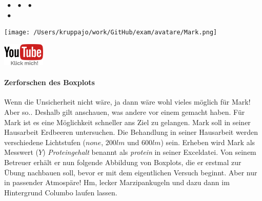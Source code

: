 \documentclass[a4paper, 9pt]{scrartcl}\usepackage[]{graphicx}\usepackage[]{xcolor}
\begin{document}
 
\ifcollection
\begin{flushright}
\tiny\vspace{-3Ex}
\textbf{\examinhaltstart}
\exammodulemathstat $\;\bullet$
\exammodulestat $\;\bullet$
\exammodulestatbbv $\;\bullet$
\exammodulestatversuch\\
\exammodulelanddaten $\;\bullet$
\exammodulebiostat
\vspace{-4Ex}
\end{flushright}
\begin{minipage}[t]{0.5\textwidth}
\texttt{[image: /Users/kruppajo/work/GitHub/exam/avatare/Mark.png]}
\end{minipage}
\begin{minipage}[t]{0.5\textwidth}
\hfill
\href{https://youtu.be/MyrNZ46i3uY}{\includegraphics[width = 2cm]{img/youtube}}
\end{minipage}
\vspace{-3ex}
\fi



\ifcollection
\paragraph{Zerforschen des Boxplots}
\fi

Wenn die Unsicherheit nicht wäre, ja dann wäre wohl vieles möglich für Mark! Aber so.. Deshalb gilt anschauen, was andere vor einem gemacht haben. Für Mark ist es eine Möglichkeit schneller ans Ziel zu gelangen. Mark soll in seiner Hausarbeit Erdbeeren untersuchen. Die Behandlung in seiner Hausarbeit werden verschiedene Lichtstufen ($none$, $200lm$ und $600lm$) sein. Erheben wird Mark als Messwert ($Y$) \textit{Proteingehalt} benannt als \textit{protein} in seiner Exceldatei. Von seinem Betreuer erhält er nun folgende Abbildung von Boxplots, die er erstmal zur Übung nachbauen soll, bevor er mit dem eigentlichen Versuch beginnt. Aber nur in passender Atmospäre! Hm, lecker Marzipankugeln und dazu dann im Hintergrund Columbo laufen lassen.
\end{document}

